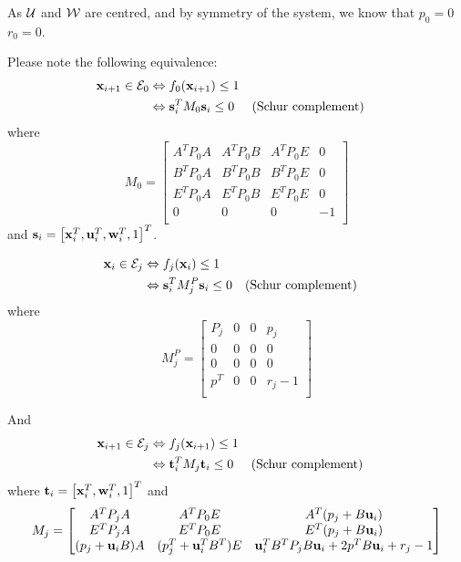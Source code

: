 As $\mathcal{U}$ and $\mathcal{W}$ are centred, and by symmetry of the system, we know that $p_0 = 0$$r_0 = 0$.

Please note the following equivalence:
\begin{align*}
 \mathbf{x}_{i+1} \in \mathcal{E}_0 
&\Leftrightarrow f_0( \mathbf{x}_{i+1}) \leq 1 \\
&\Leftrightarrow  \mathbf{s}_i^T M_0  \mathbf{s}_i \leq 0 && \text{(Schur complement)}
\end{align*}
where
\begin{equation}
M_0 =
\begin{bmatrix}
A^T P_0 A & A^T P_0 B & A^T P_0 E & 0 \\
B^T P_0 A & B^T P_0 B & B^T P_0 E & 0 \\
E^T P_0 A & E^T P_0 B & E^T P_0 E & 0 \\
0       & 0       & 0       & -1 \\
\end{bmatrix}
\end{equation}
and $ \mathbf{s}_i = \left[  \mathbf{x}_i^T,  \mathbf{u}_i^T,  \mathbf{w}_i^T, 1 \right]^T$.

\begin{align*}
 \mathbf{x}_{i} \in \mathcal{E}_j 
&\Leftrightarrow f_j( \mathbf{x}_{i}) \leq 1 \\
&\Leftrightarrow  \mathbf{s}_i^T M^P_{j}  \mathbf{s}_i \leq 0 && \text{(Schur complement)}
\end{align*}
where
\begin{equation}
M^P_{j} =
\begin{bmatrix}
  P_j 	& 0 & 0 & p_j\\
  0 	& 0 & 0 & 0\\
  0 	& 0 & 0 & 0\\
  p^T 	& 0 & 0 & r_j-1\\
\end{bmatrix}
\end{equation}

And
\begin{align*}
 \mathbf{x}_{i+1} \in \mathcal{E}_j
&\Leftrightarrow f_j( \mathbf{x}_{i+1}) \leq 1 \\
&\Leftrightarrow  \mathbf{t}_i^T M_j  \mathbf{t}_i \leq 0 && \text{(Schur complement)}
\end{align*}
where $ \mathbf{t}_i = \left[  \mathbf{x}_i^T,  \mathbf{w}_i^T, 1 \right]^T$ and
\begin{equation}
M_j =
\begin{bmatrix}
A^T P_j A 			& A^T P_0 E 		& A^T (p_j + B  \mathbf{u}_i ) \\
E^T P_j A 			& E^T P_0 E 		& E^T (p_j + B  \mathbf{u}_i) \\
(p_j +  \mathbf{u}_i B) A 	& (p_j^T +  \mathbf{u}_i^T B^T) E  &
 \mathbf{u}_i^T B^T P_j B  \mathbf{u}_i + 2 p^T B  \mathbf{u}_i + r_j - 1\\
\end{bmatrix}
\end{equation}

